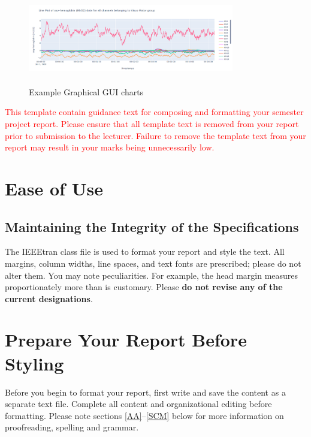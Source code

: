 \documentclass[conference]{IEEEtran}
\begin{document}
\begin{figure}[htbp]
\centerline{\includegraphics[width=9cm, height=4cm]{Figure11.png}}
\caption{Example Graphical GUI charts}
\label{fig11}
\end{figure}









\textcolor{red}{This template contain guidance text for composing and formatting your semester project report. Please ensure that all template text is removed from your report prior to submission to the lecturer. Failure to remove the template text from your report may result in your marks being unnecessarily low.}

\section{Ease of Use}

\subsection{Maintaining the Integrity of the Specifications}

The IEEEtran class file is used to format your report and style the text. All margins, 
column widths, line spaces, and text fonts are prescribed; please do not 
alter them. You may note peculiarities. For example, the head margin
measures proportionately more than is customary. %
Please \textbf{do not revise any of the current designations}.

\section{Prepare Your Report Before Styling}
Before you begin to format your report, first write and save the content as a separate text file. Complete all content and organizational editing before formatting. Please note sections \ref{AA}--\ref{SCM} below for more information on 
proofreading, spelling and grammar.
\end{document}
